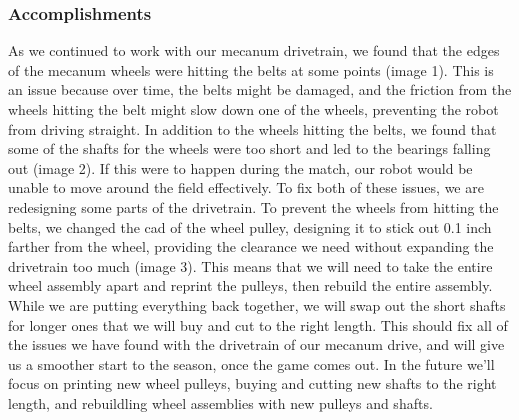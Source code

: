 \subsubsection*{Accomplishments}
As we continued to work with our mecanum drivetrain, we found that the edges of the mecanum wheels were hitting the belts at some points (image 1). This is an issue because over time, the belts might be damaged, and the friction from the wheels hitting the belt might slow down one of the wheels, preventing the robot from driving straight. In addition to the wheels hitting the belts, we found that some of the shafts for the wheels were too short and led to the bearings falling out (image 2). If this were to happen during the match, our robot would be unable to move around the field effectively. To fix both of these issues, we are redesigning some parts of the drivetrain. To prevent the wheels from hitting the belts, we changed the cad of the wheel pulley, designing it to stick out 0.1 inch farther from the wheel, providing the clearance we need without expanding the drivetrain too much (image 3). This means that we will need to take the entire wheel assembly apart and reprint the pulleys, then rebuild the entire assembly. While we are putting everything back together, we will swap out the short shafts for longer ones that we will buy and cut to the right length. This should fix all of the issues we have found with the drivetrain of our mecanum drive, and will give us a smoother start to the season, once the game comes out. In the future we'll focus on printing new wheel pulleys,
buying and cutting new shafts to the right length, and 
rebuildling wheel assemblies with new pulleys and shafts.



